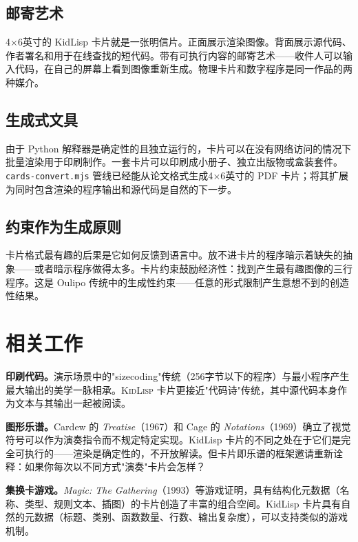 \documentclass[10pt,letterpaper,twocolumn]{article}
\newcommand{\kidlisp}{\textsc{KidLisp}}
\begin{document}
\subsection{邮寄艺术}

4$\times$6英寸的 KidLisp 卡片就是一张明信片。正面展示渲染图像。背面展示源代码、作者署名和用于在线查找的短代码。带有可执行内容的邮寄艺术------收件人可以输入代码，在自己的屏幕上看到图像重新生成。物理卡片和数字程序是同一作品的两种媒介。

\subsection{生成式文具}

由于 Python 解释器是确定性的且独立运行的，卡片可以在没有网络访问的情况下批量渲染用于印刷制作。一套卡片可以印刷成小册子、独立出版物或盒装套件。\texttt{cards-convert.mjs} 管线已经能从论文格式生成4$\times$6英寸的 PDF 卡片；将其扩展为同时包含渲染的程序输出和源代码是自然的下一步。

\subsection{约束作为生成原则}

卡片格式最有趣的后果是它如何反馈到语言中。放不进卡片的程序暗示着缺失的抽象------或者暗示程序做得太多。卡片约束鼓励经济性：找到产生最有趣图像的三行程序。这是 Oulipo 传统中的生成性约束------任意的形式限制产生意想不到的创造性结果。


\section{相关工作}

\textbf{印刷代码。}演示场景中的"sizecoding"传统（256字节以下的程序）与最小程序产生最大输出的美学一脉相承。\kidlisp{} 卡片更接近"代码诗"传统，其中源代码本身作为文本与其输出一起被阅读。

\textbf{图形乐谱。}Cardew 的 \emph{Treatise}（1967）和 Cage 的 \emph{Notations}（1969）确立了视觉符号可以作为演奏指令而不规定特定实现。KidLisp 卡片的不同之处在于它们是完全可执行的------渲染是确定性的，不开放解读。但卡片即乐谱的框架邀请重新诠释：如果你每次以不同方式"演奏"卡片会怎样？

\textbf{集换卡游戏。}\emph{Magic: The Gathering}（1993）等游戏证明，具有结构化元数据（名称、类型、规则文本、插图）的卡片创造了丰富的组合空间。KidLisp 卡片具有自然的元数据（标题、类别、函数数量、行数、输出复杂度），可以支持类似的游戏机制。
\end{document}
